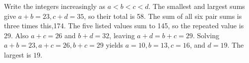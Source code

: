 Write the integers increasingly as $ a<b<c<d $. The smallest and largest sums give $ a+b=23,c+d=35 $, so their total is 58. The sum of all six pair sums is three times this,174. The five listed values sum to 145, so the repeated value is 29. Also $ a+c=26 $ and $ b+d=32 $, leaving $ a+d=b+c=29 $. Solving $ a+b=23,a+c=26,b+c=29 $ yields $ a=10,b=13,c=16 $, and $ d=19 $. The largest is $\boxed{19}$.
